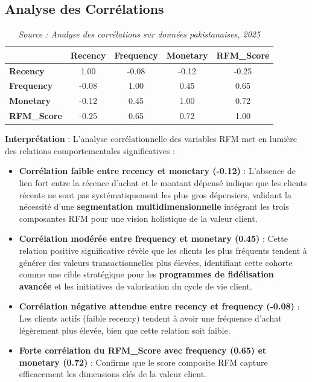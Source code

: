 \documentclass[a4paper,12pt]{article}
\begin{document}
\subsection{Analyse des Corrélations}

\begin{table}[H]
    \centering
    \begin{tabular}{|l|c|c|c|c|}
    \hline
    & \textbf{Recency} & \textbf{Frequency} & \textbf{Monetary} & \textbf{RFM\_Score} \\
    \hline
    \textbf{Recency} & 1.00 & -0.08 & -0.12 & -0.25 \\
    \textbf{Frequency} & -0.08 & 1.00 & 0.45 & 0.65 \\
    \textbf{Monetary} & -0.12 & 0.45 & 1.00 & 0.72 \\
    \textbf{RFM\_Score} & -0.25 & 0.65 & 0.72 & 1.00 \\
    \hline
    \end{tabular}
    \caption{Matrice de corrélation des variables RFM du dataset pakistanais}
    \caption*{\textit{Source : Analyse des corrélations sur données pakistanaises, 2025}}
    \label{tab:corr_matrix}
\end{table}

\textbf{Interprétation} :
L'analyse corrélationnelle des variables RFM met en lumière des relations comportementales significatives :

\begin{itemize}
    \item \textbf{Corrélation faible entre recency et monetary (-0.12)} : L'absence de lien fort entre la récence d'achat et le montant dépensé indique que les clients récents ne sont pas systématiquement les plus gros dépensiers, validant la nécessité d'une \textbf{segmentation multidimensionnelle} intégrant les trois composantes RFM pour une vision holistique de la valeur client.
    
    \item \textbf{Corrélation modérée entre frequency et monetary (0.45)} : Cette relation positive significative révèle que les clients les plus fréquents tendent à générer des valeurs transactionnelles plus élevées, identifiant cette cohorte comme une cible stratégique pour les \textbf{programmes de fidélisation avancée} et les initiatives de valorisation du cycle de vie client.
    
    \item \textbf{Corrélation négative attendue entre recency et frequency (-0.08)} : Les clients actifs (faible recency) tendent à avoir une fréquence d'achat légèrement plus élevée, bien que cette relation soit faible.
    
    \item \textbf{Forte corrélation du RFM\_Score avec frequency (0.65) et monetary (0.72)} : Confirme que le score composite RFM capture efficacement les dimensions clés de la valeur client.
\end{itemize}
\end{document}
